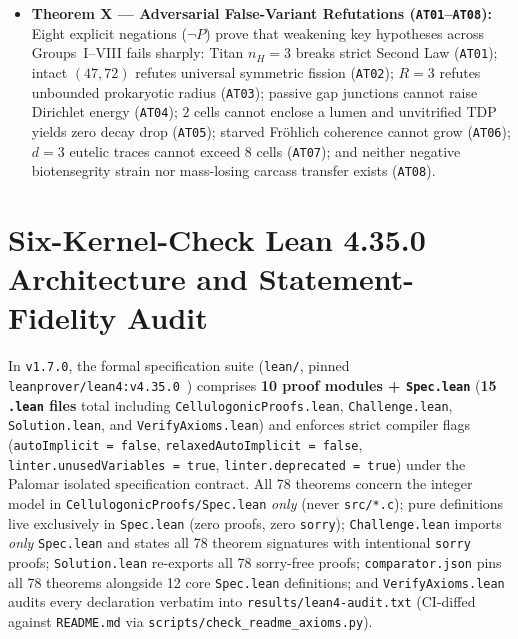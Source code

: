 \documentclass[11pt,reqno]{amsart}
\theoremstyle{plain}
\theoremstyle{definition}
\theoremstyle{remark}
\newcommand{\code}[1]{{\footnotesize\nolinkurl{#1}}}
\begin{document}
\begin{itemize}[leftmargin=1.6em, itemsep=2pt]
  \item \textbf{Theorem X --- Adversarial False-Variant Refutations (\texttt{AT01}--\texttt{AT08}):} Eight explicit negations ($\neg P$) prove that weakening key hypotheses across Groups~I--VIII fails sharply: Titan $n_H = 3$ breaks strict Second Law (\texttt{AT01}); intact $(47,72)$ refutes universal symmetric fission (\texttt{AT02}); $R=3$ refutes unbounded prokaryotic radius (\texttt{AT03}); passive gap junctions cannot raise Dirichlet energy (\texttt{AT04}); $2$ cells cannot enclose a lumen and unvitrified TDP yields zero decay drop (\texttt{AT05}); starved Fr\"ohlich coherence cannot grow (\texttt{AT06}); $d=3$ eutelic traces cannot exceed $8$ cells (\texttt{AT07}); and neither negative biotensegrity strain nor mass-losing carcass transfer exists (\texttt{AT08}).
\end{itemize}

\section{Six-Kernel-Check Lean 4.35.0 Architecture and Statement-Fidelity Audit}
\label{sec:lean}

In \texttt{v1.7.0}, the formal specification suite (\code{lean/}, pinned \code{leanprover/lean4:v4.35.0}~\cite{demoura2021}) comprises \textbf{10 proof modules + \code{Spec.lean}} (\textbf{15 \code{.lean} files} total including \code{CellulogonicProofs.lean}, \code{Challenge.lean}, \code{Solution.lean}, and \code{VerifyAxioms.lean}) and enforces strict compiler flags (\code{autoImplicit = false}, \code{relaxedAutoImplicit = false}, \code{linter.unusedVariables = true}, \code{linter.deprecated = true}) under the Palomar isolated specification contract. All 78 theorems concern the integer model in \code{CellulogonicProofs/Spec.lean} \emph{only} (never \code{src/*.c}); pure definitions live exclusively in \code{Spec.lean} (zero proofs, zero \code{sorry}); \code{Challenge.lean} imports \emph{only} \code{Spec.lean} and states all 78 theorem signatures with intentional \code{sorry} proofs; \code{Solution.lean} re-exports all 78 sorry-free proofs; \code{comparator.json} pins all 78 theorems alongside 12 core \code{Spec.lean} definitions; and \code{VerifyAxioms.lean} audits every declaration verbatim into \code{results/lean4-audit.txt} (CI-diffed against \code{README.md} via \code{scripts/check_readme_axioms.py}).
\end{document}

